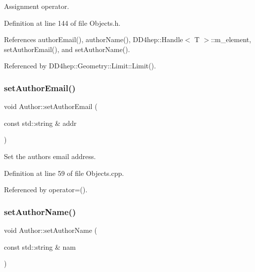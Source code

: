 Assignment operator. 



Definition at line 144 of file Objects.\+h.



References author\+Email(), author\+Name(), D\+D4hep\+::\+Handle$<$ T $>$\+::m\+\_\+element, set\+Author\+Email(), and set\+Author\+Name().



Referenced by D\+D4hep\+::\+Geometry\+::\+Limit\+::\+Limit().

\hypertarget{class_d_d4hep_1_1_geometry_1_1_author_a0e51de9a1fef12422800b96164296ae4}{}\label{class_d_d4hep_1_1_geometry_1_1_author_a0e51de9a1fef12422800b96164296ae4} 
\subsubsection{\texorpdfstring{set\+Author\+Email()}{setAuthorEmail()}}
{\footnotesize\ttfamily void Author\+::set\+Author\+Email (\begin{DoxyParamCaption}\item[{const std\+::string \&}]{addr }\end{DoxyParamCaption})}



Set the author\textquotesingle{}s email address. 



Definition at line 59 of file Objects.\+cpp.



Referenced by operator=().

\hypertarget{class_d_d4hep_1_1_geometry_1_1_author_aca1a9559e7b890d4b817b1a5286a034a}{}\label{class_d_d4hep_1_1_geometry_1_1_author_aca1a9559e7b890d4b817b1a5286a034a} 
\subsubsection{\texorpdfstring{set\+Author\+Name()}{setAuthorName()}}
{\footnotesize\ttfamily void Author\+::set\+Author\+Name (\begin{DoxyParamCaption}\item[{const std\+::string \&}]{nam }\end{DoxyParamCaption})}



